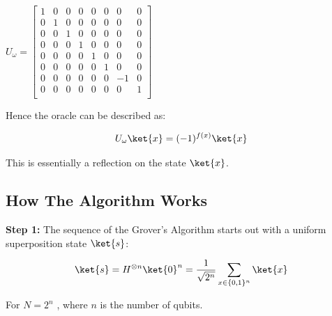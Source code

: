 \documentclass{article}
\begin{document}
\qquad $ U_\omega = \begin{bmatrix}

1 & 0 & 0 & 0 & 0& 0 & 0& 0 \\
0 & 1 & 0 & 0 & 0& 0 & 0& 0 \\
0 & 0 & 1 & 0 & 0& 0 & 0& 0 \\
0 & 0 & 0 & 1 & 0& 0 & 0& 0 \\
0 & 0 & 0 & 0 & 1& 0 & 0& 0 \\
0 & 0 & 0 & 0 & 0& 1 & 0& 0 \\
0 & 0 & 0 & 0 & 0& 0 & -1& 0 \\
0 & 0 & 0 & 0 & 0& 0 & 0& 1 \\

\end{bmatrix}$
\vspace{5mm}

Hence the oracle can be described as:
\vspace{5mm}

\begin{equation}
U_\omega\ket{x} = (-1)^{f(x)} \ket{x}    
\end{equation}
\vspace{5mm}

This is essentially a reflection on the state $\ket{x}$.

\pagebreak

\subsection{How The Algorithm Works} \label{How the Algorithm Works}
\vspace{5mm}

\textbf{Step 1:}
\vspace{5mm}
\noindent
The sequence of the Grover's Algorithm starts out with a uniform superposition state $\ket{s}$\cite{noauthor_grovers_nodate}:
\vspace{5mm}

\begin{equation}
\ket{s}= H^{\otimes n} \ket{0}^n = \frac{1}{\sqrt{2^n}}\sum\limits_{x \in \{0,1\}^n}\ket{x}
\end{equation}
\vspace{5mm}

\qquad For $N = 2^n$ , where $n$ is the number of qubits.
\vspace{5mm}
\end{document}

